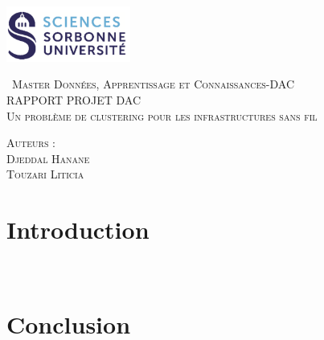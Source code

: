 \documentclass{article}
\begin{document}
\begin{titlepage}
    \begin{flushleft}
    \includegraphics[width=11em]{logo.png}\\[1.5cm]
    \end{flushleft}
    \begin{center}
        \textsc{{\LARGE \ Master Données, Apprentissage et Connaissances-DAC}}\\[4cm]
        \textsc{\Huge{RAPPORT PROJET DAC}}\\[1cm]
        \textsc{\Huge{Un problème de clustering pour les infrastructures sans fil}}\\[5.5cm]
        \begin{minipage}{1\textwidth}
            \begin{flushleft} \large
            \textsc{\LARGE{Auteurs :}}\\[0.5cm]
            \textsc{Djeddal Hanane}\\
            \textsc{Touzari Liticia}\\
            \end{flushleft}
        \end{minipage}
        \vfill
    \end{center}
  \end{titlepage}
  
\maketitle
\tableofcontents					%


\newpage


\section{Introduction}
\paragraph{}
    \begin{Large}\\[3.5cm]
        \begin{center}
        \end{center}
    \end{Large}
\newpage



\section{Conclusion} 
\end{document}
